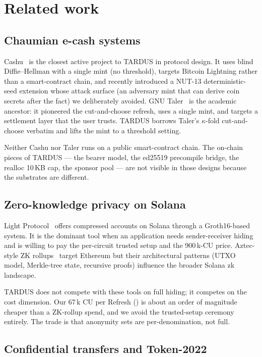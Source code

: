 \section{Related work}
\label{sec:related-work}

\subsection{Chaumian e-cash systems}

Cashu~\cite{cashu} is the closest active project to TARDUS in protocol design. It uses blind Diffie--Hellman with a single mint (no threshold), targets Bitcoin Lightning rather than a smart-contract chain, and recently introduced a NUT-13 deterministic-seed extension whose attack surface (an adversary mint that can derive coin secrets after the fact) we deliberately avoided. GNU Taler~\cite{dold2019} is the academic ancestor: it pioneered the cut-and-choose refresh, uses a single mint, and targets a settlement layer that the user trusts. TARDUS borrows Taler's $\kappa$-fold cut-and-choose verbatim and lifts the mint to a threshold setting.

Neither Cashu nor Taler runs on a public smart-contract chain. The on-chain pieces of TARDUS --- the bearer model, the ed25519 precompile bridge, the realloc 10\,KB cap, the sponsor pool --- are not visible in those designs because the substrates are different.

\subsection{Zero-knowledge privacy on Solana}

Light Protocol~\cite{lightprotocol} offers compressed accounts on Solana through a Groth16-based system. It is the dominant tool when an application needs sender-receiver hiding and is willing to pay the per-circuit trusted setup and the 900\,k-CU price. Aztec-style ZK rollups~\cite{aztec} target Ethereum but their architectural patterns (UTXO model, Merkle-tree state, recursive proofs) influence the broader Solana zk landscape.

TARDUS does not compete with these tools on full hiding; it competes on the cost dimension. Our 67\,k CU per Refresh () is about an order of magnitude cheaper than a ZK-rollup spend, and we avoid the trusted-setup ceremony entirely. The trade is that anonymity sets are per-denomination, not full.

\subsection{Confidential transfers and Token-2022}
\label{sec:related-conf-mint}

